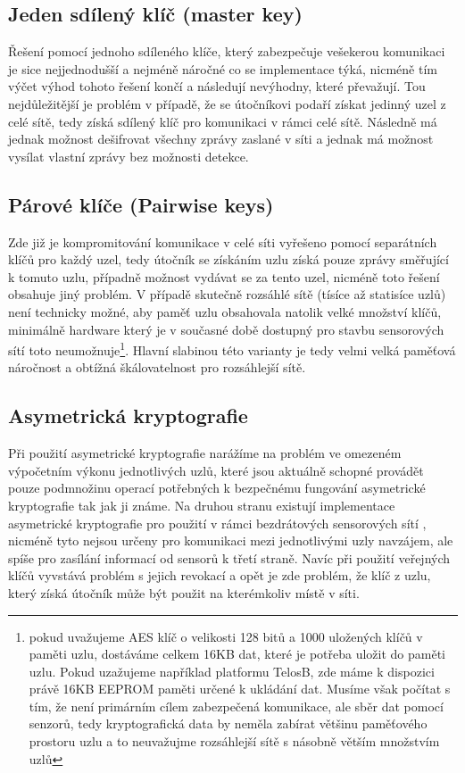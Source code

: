 \documentclass[11pt,final,twoside]{fithesis2}
\begin{document}
\subsection{Jeden sdílený klíč (master key)} Řešení pomocí jednoho sdíleného klíče, který zabezpečuje vešekerou komunikaci je sice nejjednodušší a 
nejméně náročné co se implementace týká, nicméně tím výčet výhod tohoto řešení končí a následují nevýhodny, které převažují. Tou nejdůležitější 
je problém v případě, že se útočníkovi podaří získat jedinný uzel z celé sítě, tedy získá sdílený klíč pro komunikaci v rámci celé sítě. Následně 
má jednak možnost dešifrovat všechny zprávy zaslané v síti a jednak má možnost vysílat vlastní zprávy bez možnosti detekce.

\subsection{Párové klíče (Pairwise keys)} Zde již je kompromitování komunikace v celé síti vyřešeno pomocí separátních klíčů pro každý uzel, 
tedy útočník se získáním uzlu získá pouze zprávy směřující k tomuto uzlu, případně možnost vydávat se za tento uzel, nicméně toto řešení 
obsahuje jiný problém. V případě skutečně rozsáhlé sítě (tísíce až statisíce uzlů) není technicky možné, aby paměť uzlu obsahovala natolik 
velké množství klíčů, minimálně hardware který je v současné době dostupný pro stavbu sensorových sítí toto neumožnuje\footnote{pokud uvažujeme 
AES\cite{Daemen1999} klíč o velikosti 128 bitů a 1000 uložených klíčů v paměti uzlu, dostáváme celkem 16KB dat, které je potřeba uložit do paměti uzlu. 
Pokud uzažujeme například platformu TelosB\cite{MemsicInc.}, zde máme k dispozici právě 16KB EEPROM paměti určené k ukládání dat. Musíme však počítat s 
tím, že není primárním cílem zabezpečená komunikace, ale sběr dat pomocí senzorů, tedy kryptografická data by neměla zabírat většinu paměťového prostoru 
uzlu a to neuvažujme rozsáhlejší sítě s násobně větším množstvím uzlů}. Hlavní slabinou této varianty je tedy velmi velká paměťová náročnost a obtížná 
škálovatelnost pro rozsáhlejší sítě. 

\subsection{Asymetrická kryptografie} Při použití asymetrické kryptografie narážíme na problém ve omezeném výpočetním výkonu jednotlivých uzlů, 
které jsou aktuálně schopné provádět pouze podmnožinu operací potřebných k bezpečnému fungování asymetrické kryptografie tak jak ji známe.
Na druhou stranu existují implementace asymetrické kryptografie pro použití v rámci bezdrátových sensorových sítí \cite{Watro2004}, nicméně 
tyto nejsou určeny pro komunikaci mezi jednotlivými uzly navzájem, ale spíše pro zasílání informací od sensorů k třetí straně. 
Navíc při použití veřejných klíčů vyvstává problém s jejich revokací a opět je zde problém, že klíč z uzlu, který získá útočník může být použit 
na kterémkoliv místě v síti.
\end{document}
